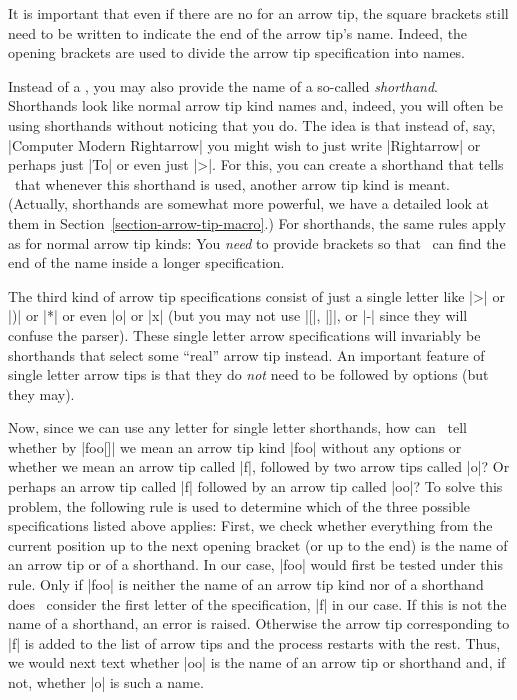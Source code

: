 It is important that even if there are no  for an arrow tip, the
square brackets still need to be written to indicate the end of the arrow tip's
name. Indeed, the opening brackets are used to divide the arrow tip
specification into names.

Instead of a , you may also provide the name of a
so-called \emph{shorthand}. Shorthands look like normal arrow tip kind names
and, indeed, you will often be using shorthands without noticing that you do.
The idea is that instead of, say, |Computer Modern Rightarrow| you might wish
to just write |Rightarrow| or perhaps just |To| or even just |>|. For this, you
can create a shorthand that tells \tikzname\ that whenever this shorthand is
used, another arrow tip kind is meant. (Actually, shorthands are somewhat more
powerful, we have a detailed look at them in
Section~\ref{section-arrow-tip-macro}.) For shorthands, the same rules apply as
for normal arrow tip kinds: You \emph{need} to provide brackets so that
\tikzname\ can find the end of the name inside a longer specification.

The third kind of arrow tip specifications consist of just a single letter like
|>| or |)| or |*| or even |o| or |x| (but you may not use |[|, |]|, or |-|
since they will confuse the parser). These single letter arrow specifications
will invariably be shorthands that select some ``real'' arrow tip instead. An
important feature of single letter arrow tips is that they do \emph{not} need
to be followed by options (but they may).

Now, since we can use any letter for single letter shorthands, how can
\tikzname\ tell whether by |foo[]| we mean an arrow tip kind |foo| without any
options or whether we mean an arrow tip called |f|, followed by two arrow tips
called |o|? Or perhaps an arrow tip called |f| followed by an arrow tip called
|oo|? To solve this problem, the following rule is used to determine which of
the three possible specifications listed above applies: First, we check whether
everything from the current position up to the next opening bracket (or up to
the end) is the name of an arrow tip or of a shorthand. In our case, |foo|
would first be tested under this rule. Only if |foo| is neither the name of an
arrow tip kind nor of a shorthand does \tikzname\ consider the first letter of
the specification, |f| in our case. If this is not the name of a shorthand, an
error is raised. Otherwise the arrow tip corresponding to |f| is added to the
list of arrow tips and the process restarts with the rest. Thus, we would next
text whether |oo| is the name of an arrow tip or shorthand and, if not, whether
|o| is such a name.

